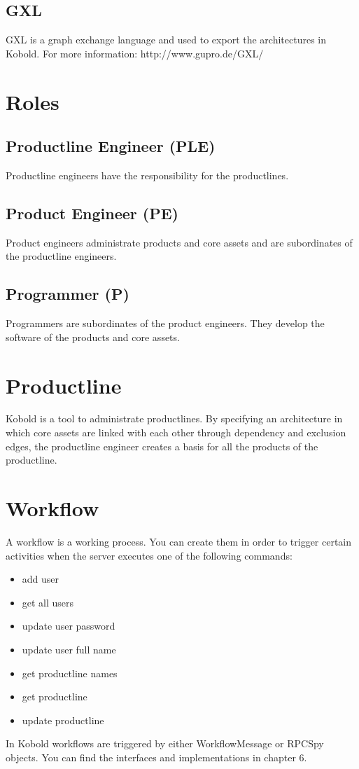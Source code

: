 \subsection{GXL}

GXL is a graph exchange language and used to export the architectures in Kobold. For more
information: http://www.gupro.de/GXL/


\section{Roles}

\subsection{Productline Engineer (PLE)}

Productline engineers have the responsibility for the productlines.

\subsection{Product Engineer (PE)}

Product engineers administrate products and core assets and are subordinates of the
productline engineers.

\subsection{Programmer (P)}

Programmers are subordinates of the product engineers. They develop the software of the
products and core assets.

\section{Productline}

Kobold is a tool to administrate productlines. By specifying an architecture in which
core assets are linked with each other through dependency and exclusion edges, the productline engineer
creates a basis for all the products of the productline. 

\section{Workflow}

A workflow is a working process. You can create them in order to trigger certain
activities when the server executes one of the following commands:

\begin{itemize}
	\item add user
	\item get all users
	\item update user password
	\item update user full name
	\item get productline names
	\item get productline
	\item update productline
\end{itemize}

In Kobold workflows are triggered by either WorkflowMessage or RPCSpy objects. You can
find the interfaces and implementations in chapter 6.